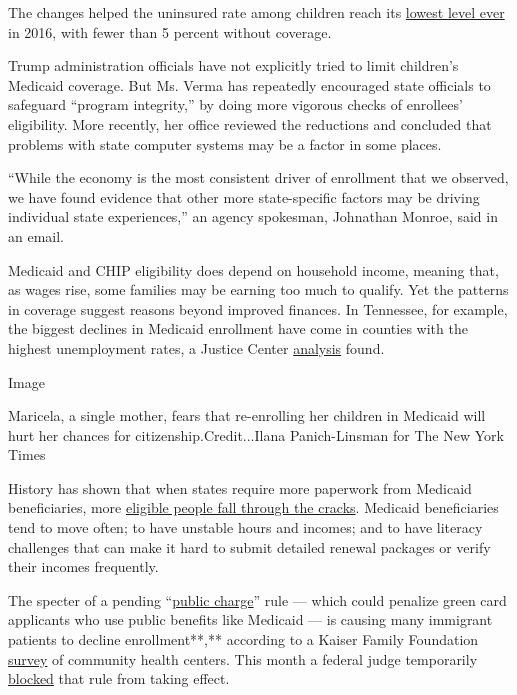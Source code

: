The changes helped the uninsured rate among children reach its
\href{https://ccf.georgetown.edu/wp-content/uploads/2017/09/Uninsured-rate-for-kids-10-17.pdf}{lowest
level ever} in 2016, with fewer than 5 percent without coverage.

Trump administration officials have not explicitly tried to limit
children's Medicaid coverage. But Ms. Verma has repeatedly encouraged
state officials to safeguard ``program integrity,'' by doing more
vigorous checks of enrollees' eligibility. More recently, her office
reviewed the reductions and concluded that problems with state computer
systems may be a factor in some places.

``While the economy is the most consistent driver of enrollment that we
observed, we have found evidence that other more state-specific factors
may be driving individual state experiences,'' an agency spokesman,
Johnathan Monroe, said in an email.

Medicaid and CHIP eligibility does depend on household income, meaning
that, as wages rise, some families may be earning too much to qualify.
Yet the patterns in coverage suggest reasons beyond improved finances.
In Tennessee, for example, the biggest declines in Medicaid enrollment
have come in counties with the highest unemployment rates, a Justice
Center
\href{https://www.tnjustice.org/wp-content/uploads/2019/07/How-Tennessee-Became-an-Outlier-in-the-Rising-Number-of-Uninsured-Children-and-What-Must-Happen-to-Reverse-the-Trend-1.pdf}{analysis}
found.

Image

Maricela, a single mother, fears that re-enrolling her children in
Medicaid will hurt her chances for citizenship.Credit...Ilana
Panich-Linsman for The New York Times

History has shown that when states require more paperwork from Medicaid
beneficiaries, more
\href{https://www.nytimes3xbfgragh.onion/2018/01/18/upshot/medicaid-enrollment-obstacles-kentucky-work-requirement.html}{eligible
people fall through the cracks}. Medicaid beneficiaries tend to move
often; to have unstable hours and incomes; and to have literacy
challenges that can make it hard to submit detailed renewal packages or
verify their incomes frequently.

The specter of a pending
``\href{https://www.nytimes3xbfgragh.onion/2019/08/14/us/immigration-public-charge-welfare.html}{public
charge}'' rule --- which could penalize green card applicants who use
public benefits like Medicaid --- is causing many immigrant patients to
decline enrollment**,** according to a Kaiser Family Foundation
\href{https://www.kff.org/medicaid/press-release/many-community-health-centers-report-that-immigrant-patients-are-declining-to-enroll-in-medicaid-or-renew-their-coverage-amid-concerns-about-changes-to-public-charge-rules/}{survey}
of community health centers. This month a federal judge temporarily
\href{https://www.nytimes3xbfgragh.onion/2019/10/11/us/immigration-public-charge-injunction.html}{blocked}
that rule from taking effect.

